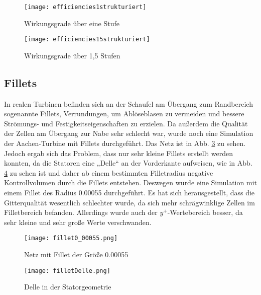 \begin{figure}[H]
	\centering
	\texttt{[image: efficiencies1strukturiert]}
	\caption{Wirkungsgrade über eine Stufe} \label{fig:efficiencies1strukturiert}
\end{figure}

\begin{figure}[H]
	\centering
	\texttt{[image: efficiencies15strukturiert]}
	\caption{Wirkungsgrade über 1,5 Stufen} \label{fig:efficiencies15strukturiert}
\end{figure}


\subsection{Fillets}

In realen Turbinen befinden sich an der Schaufel am Übergang zum Randbereich sogenannte Fillets, Verrundungen, um Ablöseblasen zu vermeiden und bessere Strömungs- und Festigkeitseigenschaften zu erzielen. Da außerdem die Qualität der Zellen am Übergang zur Nabe sehr schlecht war, wurde noch eine Simulation der Aachen-Turbine mit Fillets durchgeführt. Das Netz ist in Abb. \ref{imgFillet1} zu sehen. Jedoch ergab sich das Problem, dass nur sehr kleine Fillets erstellt werden konnten, da die Statoren eine „Delle“ an der Vorderkante aufweisen, wie in Abb. \ref{imgFilletDelle} zu sehen ist und daher ab einem bestimmten Filletradius negative Kontrollvolumen durch die Fillets entstehen. Deswegen wurde eine Simulation mit einem Fillet des Radius 0.00055 durchgeführt. Es hat sich herausgestellt, dass die Gitterqualität wesentlich schlechter wurde, da sich mehr schrägwinklige Zellen im Filletbereich befanden. Allerdings wurde auch der $y^+$-Wertebereich  besser, da sehr kleine und sehr große Werte verschwanden.     

  \begin{figure}[H]
	\centering
	\texttt{[image: fillet0\_00055.png]}
	\caption{Netz mit Fillet der Größe 0.00055} \label{imgFillet1}
\end{figure} 

  \begin{figure}[H]
	\centering
	\texttt{[image: filletDelle.png]}
	\caption{Delle in der Statorgeometrie} \label{imgFilletDelle}
\end{figure} 